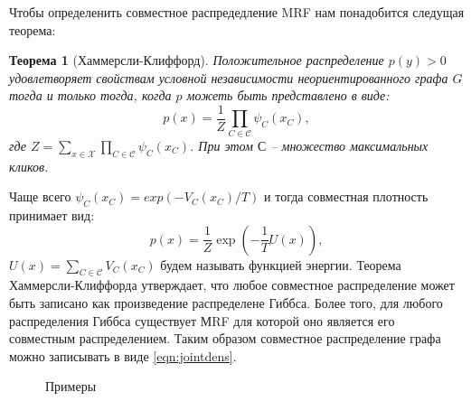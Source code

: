 \documentclass[12pt]{article}
\newtheorem{theorem}{Теорема}
\begin{document}
Чтобы определенить совместное распредедление MRF нам понадобится следущая теорема:
\begin{theorem}[Хаммерсли-Клиффорд]
Положительное распределение $p(y) > 0$ удовлетворяет свойствам условной независимости неориентированного графа $G$ тогда и только тогда, когда $p$ можеть быть представлено в виде:
\begin{equation}
p(x) = \frac{1}{Z} \prod\limits_{C \in \mathcal{C}} \psi_C(x_C), 
\label{eqn:jointdens}
\end{equation}
где $Z  = \sum\limits_{x \in \mathcal{X}} \prod\limits_{C \in \mathcal{C}} \psi_C(x_C)$.
При этом $\mathcal{С}$ -- множество максимальных кликов.
\end{theorem}


Чаще всего $\psi_C(x_C) = exp(-V_C(x_C)/T)$ и тогда совместная плотность принимает вид:
\begin{equation}
p(x) = \frac{1}{Z} \exp\left(-\frac{1}{T} U(x)\right),   
\label{eqn:eng_function}
\end{equation}
$U(x) = \sum_{C \in \mathcal{C}}V_C(x_C)$ будем называть функцией энергии.
Теорема  Хаммерсли-Клиффорда утверждает, что любое совместное распределение может быть записано как произведение распределене Гиббса. Более того, для любого распределения Гиббса существует МRF для которой оно является его совместным распределением. Таким образом совместное распределение графа можно записывать в виде \eqref{eqn:jointdens}.


\begin{figure}[hhh]
\centering
{}
\label{fig:mrf}
\caption{Примеры}
\end{figure}
\end{document}
